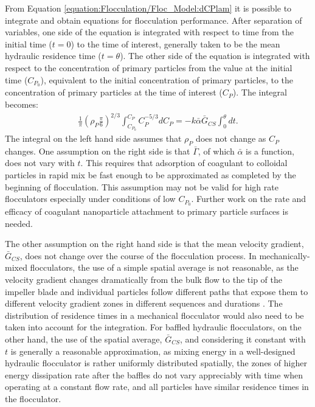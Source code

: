 \documentclass[letterpaper,10pt,english]{sphinxmanual}
\begin{document}
From Equation \eqref{equation:Flocculation/Floc_Model:dCPlam} it is possible to integrate and obtain equations for flocculation performance. After separation of variables, one side of the equation is integrated with respect to time from the initial time (\(t=0\)) to the time of interest, generally taken to be the mean hydraulic residence time (\(t=\theta\)). The other side of the equation is integrated with respect to the concentration of primary particles from the value at the initial time (\(C_{P_0}\)), equivalent to the initial concentration of primary particles, to the concentration of primary particles at the time of interest (\(C_{P}\)). The integral becomes:
\begin{equation}\label{equation:Flocculation/Floc_Model:intdCPlam}
\begin{split}      \frac{1}{\pi}\left(\rho_{P}\frac{\pi}{6}\right)^{2/3}\int_{C_{P_0}}^{C_{P}}C_{P}^{-5/3}dC_{P}=-k\bar{\alpha}\bar G_{CS}\int_0^\theta dt.\end{split}
\end{equation}
The integral on the left hand side assumes that \(\rho_{P}\) does not change as \(C_P\) changes. One assumption on the right side is that \(\bar{\Gamma}\), of which \(\bar{\alpha}\) is a function, does not vary with \(t\). This requires that adsorption of coagulant to colloidal particles in rapid mix be fast enough to be approximated as completed by the beginning of flocculation. This assumption may not be valid for high rate flocculators especially under conditions of low \(C_{P_0}\). Further work on the rate and efficacy of coagulant nanoparticle attachment to primary particle surfaces is needed.

The other assumption on the right hand side is that the mean velocity gradient, \(\bar G_{CS}\), does not change over the course of the flocculation process. In mechanically-mixed flocculators, the use of a simple spatial average is not reasonable, as the velocity gradient changes dramatically from the bulk flow to the tip of the impeller blade and individual particles follow different paths that expose them to different velocity gradient zones in different sequences and durations \label{\detokenize{Flocculation/Floc_Model:id6}}{\hyperref[\detokenize{Flocculation/Floc_Model:floc-model-boller-particles-1998}]{\sphinxcrossref{{[}BB98{]}}}}. The distribution of residence times in a mechanical flocculator would also need to be taken into account for the integration. For baffled hydraulic flocculators, on the other hand, the use of the spatial average, \(\bar G_{CS}\), and considering it constant with \(t\) is generally a reasonable approximation, as mixing energy in a well-designed hydraulic flocculator is rather uniformly distributed spatially, the zones of higher energy dissipation rate after the baffles do not vary appreciably with time when operating at a constant flow rate, and all particles have similar residence times in the flocculator.
\end{document}
